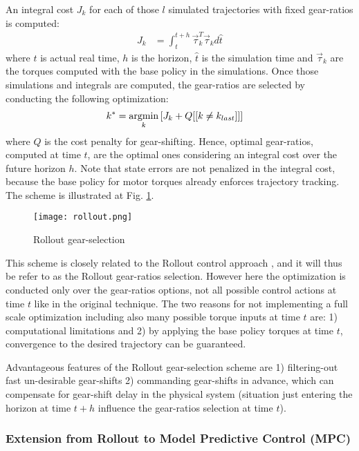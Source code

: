 An integral cost $J_k$ for each of those $l$ simulated trajectories with fixed gear-ratios is computed:
%
\begin{align}
J_k &= \int_t^{t+h} \vec{\tau}_k^T \vec{\tau}_k d\hat{t}
\end{align}
%
where $t$ is actual real time, $h$ is the horizon, $\hat{t}$ is the simulation time and $\vec{\tau}_k$ are the torques computed with the base policy in the simulations. Once those simulations and integrals are computed, the gear-ratios are selected by conducting the following optimization:
%
\begin{align}
k^{*}      &= \operatornamewithlimits{argmin}\limits_{k} \left[ J_k + Q [[ k \neq k_{last}]] \right] %
\end{align}
%
where $Q$ is the cost penalty for gear-shifting. Hence, optimal gear-ratios, computed at time $t$, are the optimal ones considering an integral cost over the future horizon $h$. Note that state errors are not penalized in the integral cost, because the base policy for motor torques already enforces trajectory tracking. The scheme is illustrated at Fig. \ref{fig:rollout}.
%
\begin{figure}[htp]
	\centering
		\texttt{[image: rollout.png]}
	\caption[Rollout gear-selection]{Rollout gear-selection}
	\label{fig:rollout}
\end{figure}


This scheme is closely related to the Rollout control approach \cite{bertsekas_dynamic_2000}, and it will thus be refer to as the Rollout gear-ratios selection.  However here the optimization is conducted only over the gear-ratios options, not all possible control actions at time $t$ like in the original technique. The two reasons for not implementing a full scale optimization including also many possible torque inputs at time $t$ are: 1) computational limitations and 2) by applying the base policy torques at time $t$, convergence to the desired trajectory can be guaranteed. 

Advantageous features of the Rollout gear-selection scheme are 1) filtering-out fast un-desirable gear-shifts 2) commanding gear-shifts in advance, which can compensate for gear-shift delay in the physical system (situation just entering the horizon at time $t+h$ influence the gear-ratios selection at time $t$).

\subsubsection{Extension from Rollout to Model Predictive Control (MPC)}

